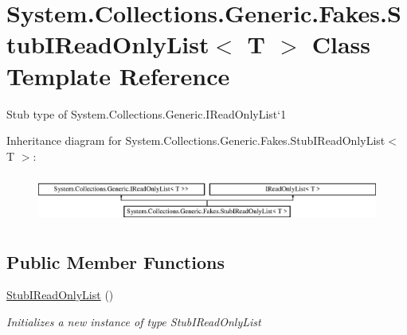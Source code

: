 \hypertarget{class_system_1_1_collections_1_1_generic_1_1_fakes_1_1_stub_i_read_only_list_3_01_t_01_4}{\section{System.\-Collections.\-Generic.\-Fakes.\-Stub\-I\-Read\-Only\-List$<$ T $>$ Class Template Reference}
\label{class_system_1_1_collections_1_1_generic_1_1_fakes_1_1_stub_i_read_only_list_3_01_t_01_4}
}


Stub type of System.\-Collections.\-Generic.\-I\-Read\-Only\-List`1 


Inheritance diagram for System.\-Collections.\-Generic.\-Fakes.\-Stub\-I\-Read\-Only\-List$<$ T $>$\-:\begin{figure}[H]
\begin{center}
\leavevmode
\includegraphics[height=1.595442cm]{class_system_1_1_collections_1_1_generic_1_1_fakes_1_1_stub_i_read_only_list_3_01_t_01_4}
\end{center}
\end{figure}
\subsection*{Public Member Functions}
\begin{DoxyCompactItemize}
\item 
\hyperlink{class_system_1_1_collections_1_1_generic_1_1_fakes_1_1_stub_i_read_only_list_3_01_t_01_4_a7797c458e6a1daa8870ad931197caf77}{Stub\-I\-Read\-Only\-List} ()
\begin{DoxyCompactList}\small\item\em Initializes a new instance of type Stub\-I\-Read\-Only\-List\end{DoxyCompactList}\end{DoxyCompactItemize}
